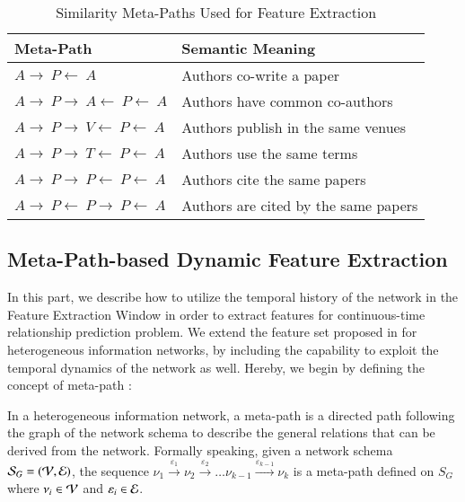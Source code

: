 \begin{table}[t]
	\centering
	\caption{Similarity Meta-Paths Used for Feature Extraction \cite{sun2012will}}
	\label{table:meta}
	\scriptsize
	\begin{tabu} to \columnwidth {X[c] X[l]}
		\toprule
		Meta-Path & Semantic Meaning \\
		\midrule
		$A\rightarrow~P\leftarrow~A$ & Authors co-write a paper\\
		$A\rightarrow~P\rightarrow~A\leftarrow~P\leftarrow~A$ & Authors have common co-authors\\
		$A\rightarrow~P\rightarrow~V\leftarrow~P\leftarrow~A$ & Authors publish in the same venues\\
		$A\rightarrow~P\rightarrow~T\leftarrow~P\leftarrow~A$ & Authors use the same terms\\
		$A\rightarrow~P\rightarrow~P\leftarrow~P\leftarrow~A$ & Authors cite the same papers\\
		$A\rightarrow~P\leftarrow~P\rightarrow~P\leftarrow~A$ & Authors are cited by the same papers\\
		\bottomrule
	\end{tabu}
\end{table}

\subsection{Meta-Path-based Dynamic Feature Extraction}
In this part, we describe how to utilize the temporal history of the network in the Feature Extraction Window in order to extract features for continuous-time relationship prediction problem. We extend the feature set proposed in \cite{sun2012will} for heterogeneous information networks, by including the capability to exploit the temporal dynamics of the network as well. Hereby, we begin by defining the concept of meta-path \cite{sun2011pathsim}:

\begin{definition}
In a heterogeneous information network, a meta-path is a directed path following the graph of the network schema to describe the general relations that can be derived from the network. Formally speaking, given a network schema $\mathcal{S}_G=(\mathcal{V}, \mathcal{E})$, the sequence $\nu_1\xrightarrow{\varepsilon_1}\nu_2\xrightarrow{\varepsilon_2}\dots\nu_{k-1}\xrightarrow{\varepsilon_{k-1}}\nu_k$ is a meta-path defined on $S_G$ where $\nu_i\in \mathcal{V}$ and $\varepsilon_i\in \mathcal{E}$.
\end{definition} 


